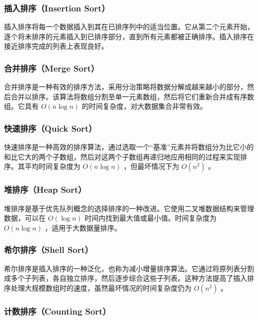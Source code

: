 \subsubsection{插入排序（Insertion Sort）}

插入排序将每一个数据插入到其在已排序列中的适当位置。它从第二个元素开始，逐个将未排序的元素插入到已排序部分，直到所有元素都被正确排序。插入排序在接近排序完成的列表上表现良好。

\subsubsection{合并排序（Merge Sort）}

合并排序是一种有效的排序方法，采用分治策略将数据分解成越来越小的部分，然后合并以排序。该算法将数组分割至单一元素数组，然后将它们重新合并成有序数组。它具有 $O(n \log n)$ 的时间复杂度，对大数据集合非常有效。

\subsubsection{快速排序（Quick Sort）}

快速排序是一种高效的排序算法，通过选取一个“基准”元素并将数组分为比它小的和比它大的两个子数组，然后对这两个子数组再递归地应用相同的过程来实现排序。其平均时间复杂度为 $O(n \log n)$ ，但最坏情况下为 $O(n^2)$ 。

\subsubsection{堆排序（Heap Sort）}

堆排序是基于优先队列概念的选择排序的一种改进。它使用二叉堆数据结构来管理数据，可以在 $O(\log n)$ 时间内找到最大值或最小值。时间复杂度为 $O(n \log n)$ ，适用于大数据量排序。

\subsubsection{希尔排序（Shell Sort）}

希尔排序是插入排序的一种泛化，也称为减小增量排序算法。它通过将原列表分割成多个子列表，各自独立排序，然后逐步综合这些子列表。这种方法提高了插入排序处理大规模数组时的速度，虽然最坏情况的时间复杂度仍为 $O(n^2)$ 。

\subsubsection{计数排序（Counting Sort）}

